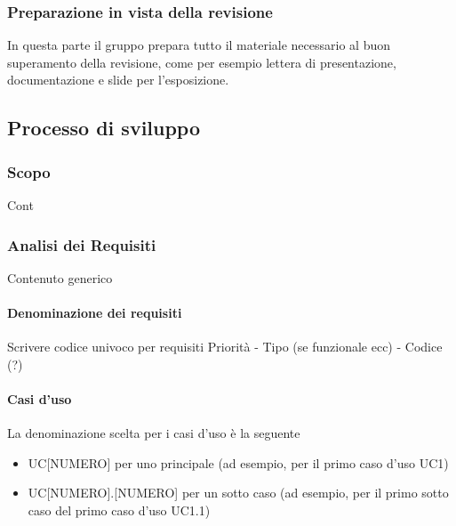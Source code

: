         \subsubsection{Preparazione in vista della revisione}
        In questa parte il gruppo prepara tutto il materiale necessario al buon superamento della revisione, come per esempio lettera di presentazione, documentazione e slide per l'esposizione.


    \subsection{Processo di sviluppo}\label{PP:Sviluppo}

        \subsubsection{Scopo}\label{PP:Sviluppo:Scopo}
        Cont


        \subsubsection{Analisi dei Requisiti}\label{PP:Sviluppo:AdR}
        Contenuto generico
        
        

		 \paragraph{Denominazione dei requisiti}\label{PP:Sviluppo:AdR:DenominazioneRequisiti}
		 Scrivere codice univoco per requisiti
		 Priorità - Tipo (se funzionale ecc) - Codice (?)
	
		 \paragraph{Casi d'uso}\label{PP:Sviluppo:AdR:CasiUso}
		 La denominazione scelta per i casi d'uso è la seguente
		 \begin{itemize}
		 	\item UC[NUMERO] per uno principale (ad esempio, per il primo caso d'uso UC1)
		 	\item UC[NUMERO].[NUMERO] per un sotto caso (ad esempio, per il primo sotto caso del primo caso d'uso UC1.1)	
		 \end{itemize}
		        


